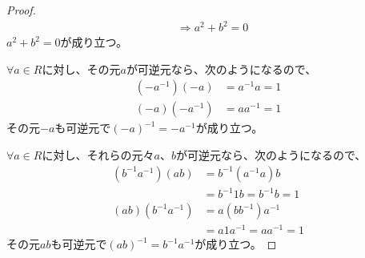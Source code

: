 \documentclass[dvipdfmx]{jsarticle}
\begin{document}
\begin{proof}
\begin{align*}
&\Rightarrow a^{2} + b^{2} = 0
\end{align*}
$a^2 +b^2 =0$が成り立つ。\par
$\forall a\in R$に対し、その元$a$が可逆元なら、次のようになるので、
\begin{align*}
\left( -a^{-1} \right) \left(-a\right) &= a^{-1} a =1\\
\left( -a\right) \left(-a^{-1} \right) &= aa^{-1} =1
\end{align*}
その元$-a$も可逆元で$(-a)^{-1} =-a^{-1}$が成り立つ。\par
$\forall a\in R$に対し、それらの元々$a$、$b$が可逆元なら、次のようになるので、
\begin{align*}
\left( b^{-1} a^{-1} \right) \left(ab\right) &= b^{-1} \left( a^{-1} a\right) b \\
&= b^{-1} 1 b =b^{-1} b =1\\
\left(ab\right)\left( b^{-1} a^{-1} \right) &= a\left( bb^{-1} \right) a^{-1} \\
&=a1a^{-1} =aa^{-1} =1
\end{align*}
その元$ab$も可逆元で$(ab)^{-1} =b^{-1} a^{-1}$が成り立つ。
\end{proof}
\end{document}
